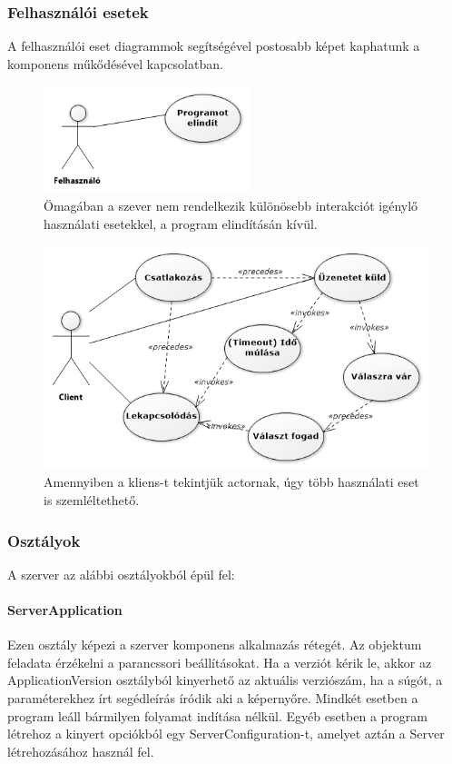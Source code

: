 \documentclass[12pt]{report}
\begin{document}
\subsubsection{Felhasználói esetek}
A felhasználói eset diagrammok segítségével postosabb képet kaphatunk a komponens műkődésével kapcsolatban.

  \begin{figure}[ht]
       \centering
    \includegraphics[width=6cm]{pics/uc.png}
	  \caption{Ömagában a szever nem rendelkezik különösebb interakciót igénylő használati esetekkel, a program elindításán kívül.}
  \end{figure}
  
    \begin{figure}[ht]
       \centering
    \includegraphics[width=15cm]{pics/client_serv_u_c.png}
	  \caption{Amennyiben a kliens-t tekintjük actornak, úgy több használati eset is szemléltethető.}
  \end{figure}
  
\subsubsection{Osztályok}
A szerver az alábbi osztályokból épül fel:
  \paragraph{ServerApplication}
  
  Ezen osztály képezi a szerver komponens alkalmazás rétegét. Az objektum feladata érzékelni a parancssori beállításokat. Ha a verziót kérik le, akkor az ApplicationVersion osztályból kinyerhető az aktuális verziószám, ha a súgót, a paraméterekhez írt segédleírás íródik aki a képernyőre. Mindkét esetben a program leáll bármilyen folyamat indítása nélkül.
  Egyéb esetben a program létrehoz a kinyert opciókból egy ServerConfiguration-t, amelyet aztán a Server létrehozásához használ fel.
\end{document}
